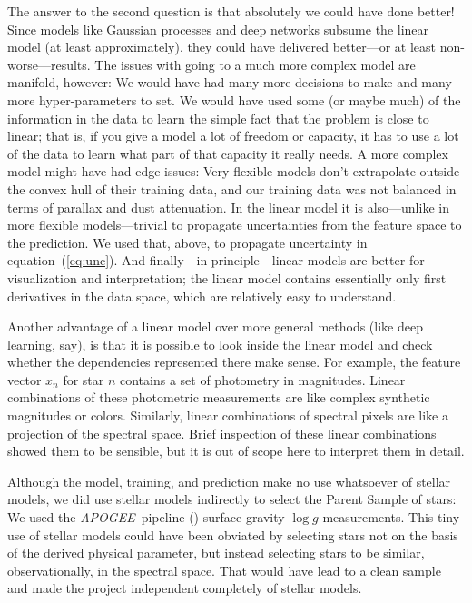 \documentclass[modern]{aastex62}
\newcommand{\equationname}{equation}
\newcommand{\acronym}[1]{{\small{#1}}}
\newcommand{\project}[1]{\textsl{#1}}
\newcommand{\apogee}{\project{\acronym{APOGEE}}}
\newcommand{\logg}{\log g}
\begin{document}
The answer to the second question is that absolutely we could have done better!
Since models like Gaussian processes and deep networks subsume the linear model
(at least approximately), they could have delivered better---or at least non-worse---results.
The issues with going to a much more complex model are manifold, however:
We would have had many more decisions to make and many more hyper-parameters
to set.
We would have used some (or maybe much) of the information in the data to learn
the simple fact that the problem is close to linear; that is, if you give a model
a lot of freedom or capacity, it has to use a lot of the data to learn what part
of that capacity it really needs.
A more complex model might have had edge issues: Very flexible models don't extrapolate
outside the convex hull of their training data, and our training data was not
balanced in terms of parallax and dust attenuation.
In the  linear model it is also---unlike in more flexible models---trivial to propagate
uncertainties from the feature space to the prediction.
We used that, above, to propagate uncertainty in \equationname~(\ref{eq:unc}).
And finally---in principle---linear models are better for visualization and interpretation;
the linear model contains essentially only first derivatives in the data space, which are
relatively easy to understand.

Another  advantage of a linear model over more general methods (like deep learning, say),
is that it is possible to look inside
the linear model and check whether the dependencies represented there make sense.
For example, the feature vector $x_n$ for star $n$
contains a set of photometry in magnitudes.
Linear combinations of these photometric measurements are like complex synthetic
magnitudes or colors.
Similarly, linear combinations of spectral pixels are like a projection of the spectral space.
Brief inspection of these linear combinations showed them to be sensible, but it is out of
scope here to interpret them in detail.

Although the model, training, and prediction make no use whatsoever of stellar
models, we did use stellar models indirectly to select the Parent Sample of stars:
We used the \apogee\ pipeline (\citealt{aspcap}) surface-gravity $\logg$ measurements.
This tiny use of stellar models could have been obviated by selecting stars not
on the basis of the derived physical parameter, but instead selecting stars to
be similar, observationally, in the spectral space.
That would have lead to a clean sample and made the project independent completely
of stellar models.
\end{document}
